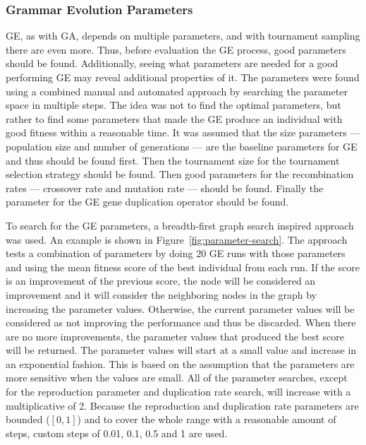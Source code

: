 
\subsubsection{Grammar Evolution Parameters}
\gls{GE}, as with \gls{GA}, depends on multiple parameters, and with tournament sampling there are even more.
Thus, before evaluation the \gls{GE} process, good parameters should be found.
Additionally, seeing what parameters are needed for a good performing \gls{GE} may reveal additional properties of it.
The parameters were found using a combined manual and automated approach by searching the parameter space in multiple steps.
The idea was not to find the optimal parameters, but rather to find some parameters that made the \gls{GE} produce an individual with good fitness within a reasonable time.
It was assumed that the size parameters --- population size and number of generations --- are the baseline parameters for \gls{GE} and thus should be found first.
Then the tournament size for the tournament selection strategy should be found.
Then good parameters for the recombination rates --- crossover rate and mutation rate --- should be found.
Finally the parameter for the \gls{GE} gene duplication operator should be found.

To search for the \gls{GE} parameters, a breadth-first graph search inspired approach was used.
An example is shown in Figure~\ref{fig:parameter-search}.
The approach tests a combination of parameters by doing 20 \gls{GE} runs with those parameters and using the mean fitness score of the best individual from each run.
If the score is an improvement of the previous score, the node will be considered an improvement and it will consider the neighboring nodes in the graph by increasing the parameter values.
Otherwise, the current parameter values will be considered as not improving the performance and thus be discarded.
When there are no more improvements, the parameter values that produced the best score will be returned.
The parameter values will start at a small value and increase in an exponential fashion.
This is based on the assumption that the parameters are more sensitive when the values are small.
All of the parameter searches, except for the reproduction parameter and duplication rate search, will increase with a multiplicative of 2.
Because the reproduction and duplication rate parameters are bounded ($[0, 1]$) and to cover the whole range with a reasonable amount of steps, custom steps of 0.01, 0.1, 0.5 and 1 are used.

